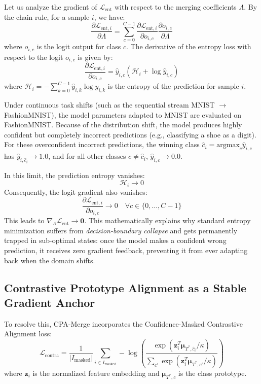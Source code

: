 \documentclass{article}
\theoremstyle{plain}
\theoremstyle{definition}
\theoremstyle{remark}
\begin{document}
Let us analyze the gradient of $\mathcal{L}_{\text{ent}}$ with respect to the merging coefficients $\Lambda$. By the chain rule, for a sample $i$, we have:
\begin{equation}
    \frac{\partial \mathcal{L}_{\text{ent}, i}}{\partial \Lambda} = \sum_{c=0}^{C-1} \frac{\partial \mathcal{L}_{\text{ent}, i}}{\partial o_{i, c}} \frac{\partial o_{i, c}}{\partial \Lambda}
\end{equation}
where $o_{i, c}$ is the logit output for class $c$. The derivative of the entropy loss with respect to the logit $o_{i, c}$ is given by:
\begin{equation}
    \frac{\partial \mathcal{L}_{\text{ent}, i}}{\partial o_{i, c}} = \hat{y}_{i, c} \left( \mathcal{H}_i + \log \hat{y}_{i, c} \right)
\end{equation}
where $\mathcal{H}_i = - \sum_{k=0}^{C-1} \hat{y}_{i, k} \log \hat{y}_{i, k}$ is the entropy of the prediction for sample $i$.

Under continuous task shifts (such as the sequential stream MNIST $\to$ FashionMNIST), the model parameters adapted to MNIST are evaluated on FashionMNIST. Because of the distribution shift, the model produces highly confident but completely incorrect predictions (e.g., classifying a shoe as a digit). For these overconfident incorrect predictions, the winning class $\hat{c}_i = \text{argmax}_c \hat{y}_{i, c}$ has $\hat{y}_{i, \hat{c}_i} \to 1.0$, and for all other classes $c \neq \hat{c}_i$, $\hat{y}_{i, c} \to 0.0$.

In this limit, the prediction entropy vanishes:
\begin{equation}
    \mathcal{H}_i \to 0
\end{equation}
Consequently, the logit gradient also vanishes:
\begin{equation}
    \frac{\partial \mathcal{L}_{\text{ent}, i}}{\partial o_{i, c}} \to 0 \quad \forall c \in \{0, \dots, C-1\}
\end{equation}
This leads to $\nabla_{\Lambda} \mathcal{L}_{\text{ent}} \to \mathbf{0}$. This mathematically explains why standard entropy minimization suffers from \emph{decision-boundary collapse} and gets permanently trapped in sub-optimal states: once the model makes a confident wrong prediction, it receives zero gradient feedback, preventing it from ever adapting back when the domain shifts.

\subsection{Contrastive Prototype Alignment as a Stable Gradient Anchor}
To resolve this, CPA-Merge incorporates the Confidence-Masked Contrastive Alignment loss:
\begin{equation}
    \mathcal{L}_{\text{contra}} = \frac{1}{|I_{\text{masked}}|} \sum_{i \in I_{\text{masked}}} -\log \left( \frac{\exp(\mathbf{z}_i^T \mathbf{\mu}_{T^*, \hat{c}_i} / \kappa)}{\sum_{c'} \exp(\mathbf{z}_i^T \mathbf{\mu}_{T^*, c'} / \kappa)} \right)
\end{equation}
where $\mathbf{z}_i$ is the normalized feature embedding and $\mathbf{\mu}_{T^*, c}$ is the class prototype.
\end{document}
